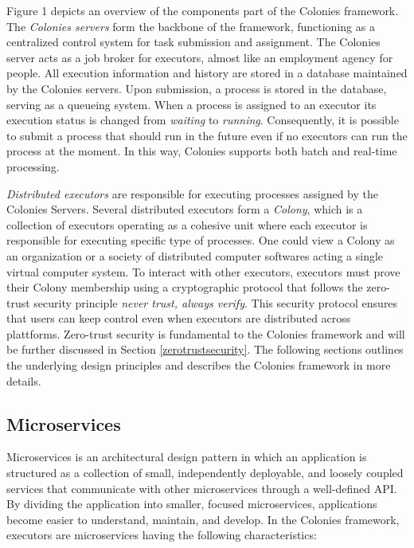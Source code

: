\documentclass{article}
\begin{document}
Figure 1 depicts an overview of the components part of the Colonies framework. The \emph{Colonies servers} form the backbone of the framework, functioning as a centralized control system for task submission and assignment. The Colonies server acts as a job broker for executors, almost like an employment agency for people. All execution information and history are stored in a database maintained by the Colonies servers. Upon submission, a process is stored in the database, serving as a queueing system. When a process is assigned to an executor its execution status is changed from \emph{waiting} to \emph{running}. Consequently, it is possible to submit a process that should run in the future even if no executors can run the process at the moment. In this way, Colonies supports both batch and real-time processing. 

\emph{Distributed executors} are responsible for executing processes assigned by the Colonies Servers. Several distributed executors form a \emph{Colony}, which is a collection of executors operating as a cohesive unit where each executor is responsible for executing specific type of processes. One could view a Colony as an organization or a society of distributed computer softwares acting a single virtual computer system. To interact with other executors, executors must prove their Colony membership using a cryptographic protocol that follows the zero-trust security principle \emph{never trust, always verify}. This security protocol ensures that users can keep control even when executors are distributed across plattforms. Zero-trust security is fundamental to the Colonies framework and will be further discussed in Section \ref{zerotrustsecurity}. The following sections outlines the underlying design principles and describes the Colonies framework in more details. 

\subsection{Microservices}
Microservices \cite{microservices} is an architectural design pattern in which an application is structured as a collection of small, independently deployable, and loosely coupled services that communicate with other microservices through a well-defined API. By dividing the application into smaller, focused microservices, applications become easier to understand, maintain, and develop. In the Colonies framework, executors are microservices having the following characteristics:
\end{document}

